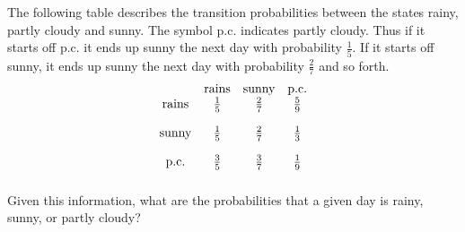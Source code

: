 \begin{enumialphparenastyle}
\begin{ex} The following table describes the transition probabilities between the
states rainy, partly cloudy and sunny. The symbol p.c. indicates partly
cloudy. Thus if it starts off p.c. it ends up sunny the next day with
probability $\frac{1}{5}.$ If it starts off sunny, it ends up sunny the next
day with probability $\frac{2}{7}$ and so forth.
\begin{equation*}
\begin{array}{cccc}
& \text{rains} & \text{sunny} & \text{p.c.} \\
\text{rains} & \vspace{0.05in}\frac{1}{5} & \vspace{0.05in}\frac{2}{7} & \vspace{0.05in}\frac{5}{9} \\
\text{sunny} & \vspace{0.05in}\frac{1}{5} & \vspace{0.05in}\frac{2}{7} & \vspace{0.05in}\frac{1}{3} \\
\text{p.c.} & \vspace{0.05in}\frac{3}{5} & \vspace{0.05in}\frac{3}{7} & \vspace{0.05in}\frac{1}{9}
\end{array}
\end{equation*}
Given this information, what are the probabilities that a given day is
rainy, sunny, or partly cloudy?
\end{ex}

\end{enumialphparenastyle}
